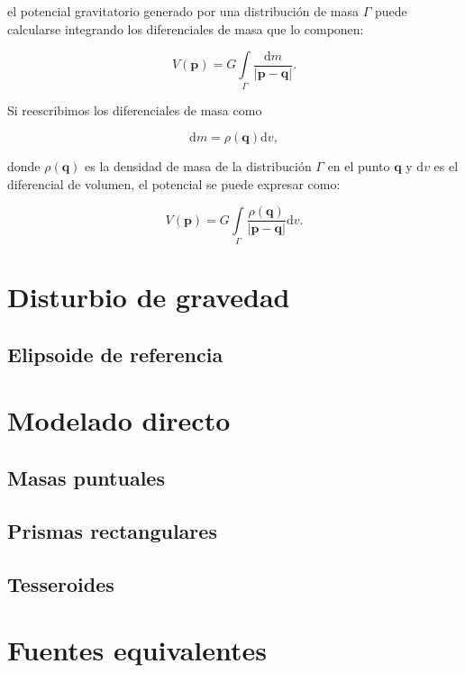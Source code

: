 \noindent el potencial gravitatorio generado por una distribución de masa
$\Gamma$ puede calcularse integrando los diferenciales de masa que lo componen:

\begin{equation}
    V(\mathbf{p}) = G \int\limits_\Gamma \frac{\text{d}m}{|\mathbf{p} - \mathbf{q}|} .
\end{equation}

Si reescribimos los diferenciales de masa como

\begin{equation}
    \text{d}m = \rho(\mathbf{q}) \text{d}v,
\end{equation}

\noindent donde $\rho(\mathbf{q})$ es la densidad de masa de la distribución
$\Gamma$ en el punto $\mathbf{q}$ y $\text{d}v$ es el diferencial de volumen,
el potencial se puede expresar como:

\begin{equation}
    V(\mathbf{p}) =
        G \int\limits_\Gamma
        \frac{\rho(\mathbf{q})}{|\mathbf{p} - \mathbf{q}|} \text{d}v.
    \label{eq:potencial-gravitatorio-integral}
\end{equation}



\section{Disturbio de gravedad}

\subsection{Elipsoide de referencia}

\section{Modelado directo}

\subsection{Masas puntuales}

\subsection{Prismas rectangulares}

\subsection{Tesseroides}

\section{Fuentes equivalentes}
